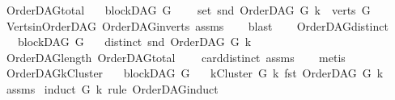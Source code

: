 \begin{isabellebody}
%
\endisatagproof
{\isafoldproof}%
%
\isadelimproof
\isanewline
%
\endisadelimproof
\isanewline
{}\isamarkupfalse%
\ OrderDAG{\isacharunderscore}{\kern0pt}total{\isacharcolon}{\kern0pt}\isanewline
\ \ \ {\isachardoublequoteopen}blockDAG\ G{\isachardoublequoteclose}\ \isanewline
\ \ \ {\isachardoublequoteopen}set\ {\isacharparenleft}{\kern0pt}snd\ {\isacharparenleft}{\kern0pt}OrderDAG\ G\ k{\isacharparenright}{\kern0pt}{\isacharparenright}{\kern0pt}\ {\isacharequal}{\kern0pt}\ verts\ G{\isachardoublequoteclose}\isanewline
%
\isadelimproof
\ \ %
\endisadelimproof
%
\isatagproof
{}\isamarkupfalse%
\ Verts{\isacharunderscore}{\kern0pt}in{\isacharunderscore}{\kern0pt}OrderDAG\ OrderDAG{\isacharunderscore}{\kern0pt}in{\isacharunderscore}{\kern0pt}verts\ assms{\isacharparenleft}{\kern0pt}{}{\isacharparenright}{\kern0pt}\isanewline
\ \ \isamarkupfalse%
\ blast%
\endisatagproof
{\isafoldproof}%
%
\isadelimproof
\ \isanewline
%
\endisadelimproof
\isanewline
{}\isamarkupfalse%
\ \ OrderDAG{\isacharunderscore}{\kern0pt}distinct{\isacharcolon}{\kern0pt}\isanewline
\ \ \ {\isachardoublequoteopen}blockDAG\ G{\isachardoublequoteclose}\isanewline
\ \ \ {\isachardoublequoteopen}distinct\ {\isacharparenleft}{\kern0pt}snd\ {\isacharparenleft}{\kern0pt}OrderDAG\ G\ k{\isacharparenright}{\kern0pt}{\isacharparenright}{\kern0pt}{\isachardoublequoteclose}\isanewline
%
\isadelimproof
\ \ %
\endisadelimproof
%
\isatagproof
{}\isamarkupfalse%
\ OrderDAG{\isacharunderscore}{\kern0pt}length\ OrderDAG{\isacharunderscore}{\kern0pt}total\isanewline
\ \ \ \ card{\isacharunderscore}{\kern0pt}distinct\ assms\isanewline
\ \ \isamarkupfalse%
\ metis%
\endisatagproof
{\isafoldproof}%
%
\isadelimproof
\ \isanewline
%
\endisadelimproof
\isanewline
{}\isamarkupfalse%
\ OrderDAG{\isacharunderscore}{\kern0pt}kCluster{\isacharcolon}{\kern0pt}\isanewline
\ \ \ {\isachardoublequoteopen}blockDAG\ G{\isachardoublequoteclose}\isanewline
\ \ \ {\isachardoublequoteopen}kCluster\ G\ k\ {\isacharparenleft}{\kern0pt}fst\ {\isacharparenleft}{\kern0pt}OrderDAG\ G\ k{\isacharparenright}{\kern0pt}{\isacharparenright}{\kern0pt}{\isachardoublequoteclose}\ \isanewline
%
\isadelimproof
\ \ %
\endisadelimproof
%
\isatagproof
{}\isamarkupfalse%
\ assms\ \isamarkupfalse%
{\isacharparenleft}{\kern0pt}induct\ G\ k\ rule{\isacharcolon}{\kern0pt}\ OrderDAG{\isachardot}{\kern0pt}induct{\isacharparenright}{\kern0pt}\isanewline

\end{isabellebody}
